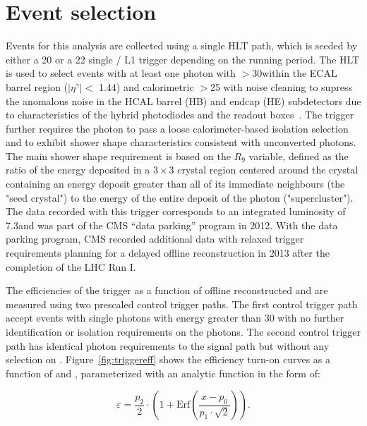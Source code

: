\section{Event selection}
\label{sec:event_selection}
Events for this analysis are collected using a single HLT path, which is seeded by either a 20 \GeV or a 22 \GeV single \Pe/\Pgg\xspace L1 trigger depending on the running period. The HLT is used to select events with at least one photon with \et$ > 30$\GeV within the ECAL barrel region ($|\eta^{\gamma}| < $ 1.44) and calorimetric \met $ > $25 \GeV with noise cleaning to supress the anomalous noise in the HCAL barrel (HB) and endcap (HE) subdetectors due to characteristics of the hybrid photodiodes and the readout boxes~\cite{hcalnoise}. The trigger further requires the photon to pass a loose calorimeter-based isolation selection and to exhibit shower shape characteristics consistent with unconverted photons. The main shower shape requirement is based on the $R_{9}$ variable, defined as the ratio of the energy deposited in a $3\times 3$ crystal region centered around the crystal containing an energy deposit greater than all of its immediate neighbours (the "seed crystal")  to the energy of the entire deposit of the photon ("supercluster"). The data recorded with this trigger corresponds to an integrated luminosity of 7.3\fbinv and was part of the CMS ``data parking'' program in 2012. With the data parking program, CMS recorded additional data with relaxed trigger requirements planning for a delayed offline reconstruction in 2013 after the completion of the LHC Run I. %

 The efficiencies of the trigger as a function of offline reconstructed \etg and \met are measured using two prescaled control trigger paths. The first control trigger path accept events with single photons with energy greater than 30 \GeV with no further identification or isolation requirements on the photons. The second control trigger path has identical photon requirements to the signal path but without any selection on \met. Figure~\ref{fig:triggereff} shows the efficiency turn-on curves as a function of \etg and \met, parameterized with an analytic function in the form of:

\begin{equation}                                                                                                                                                                  
\label{eq:acc}                                                                                                                                                                    
        \varepsilon = \frac{p_2}{2} \cdot \left( 1 + \text{Erf}\left(\frac{x - p_0}{p_1 \cdot \sqrt{2}}\right)\right).
\end{equation}            

